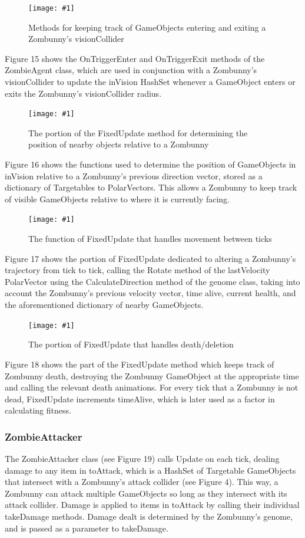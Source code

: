 \documentclass[letterpaper]{article}
\def\imfig#1#2{\begin{figure}[h] \centering \texttt{[image: \#1]} \caption{#2} \end{figure}}
\def\imfigH#1#2{\begin{figure}[H] \centering \texttt{[image: \#1]} \caption{#2} \end{figure}}
\begin{document}
\imfigH{ZombieAgentVision}{Methods for keeping track of GameObjects entering
  and exiting a Zombunny's visionCollider}

Figure 15 shows the OnTriggerEnter and OnTriggerExit methods of the ZombieAgent
class, which are used in conjunction with a Zombunny's visionCollider to update
the inVision HashSet whenever a GameObject enters or exits the Zombunny's
visionCollider radius.

\imfigH{ZombieAgentUpdateNearby}{The portion of the FixedUpdate method for
determining the position of nearby objects relative to a Zombunny}

Figure 16 shows the functions used to determine the position of GameObjects in
inVision relative to a Zombunny's previous direction vector, stored as a
dictionary of Targetables to PolarVectors. This allows a Zombunny to keep track
of visible GameObjects relative to where it is currently facing.

\imfig{ZombieAgentUpdateMovement}{The function of FixedUpdate that handles
  movement between ticks}

Figure 17 shows the portion of FixedUpdate dedicated to altering a Zombunny's
trajectory from tick to tick, calling the Rotate method of the lastVelocity
PolarVector using the CalculateDirection method of the genome class, taking into
account the Zombunny's previous velocity vector, time alive, current health, and
the aforementioned dictionary of nearby GameObjects.

\imfig{ZombieAgentUpdateDeath}{The portion of FixedUpdate that handles
  death/deletion}

Figure 18 shows the part of the FixedUpdate method which keeps track of Zombunny
death, destroying the Zombunny GameObject at the appropriate time and calling
the relevant death animations. For every tick that a Zombunny is not dead,
FixedUpdate increments timeAlive, which is later used as a factor in
calculating fitness.

\subsubsection{ZombieAttacker}

The ZombieAttacker class (see Figure 19) calls Update on each tick, dealing damage to any item
in toAttack, which is a HashSet of Targetable GameObjects that intersect with
a Zombunny's attack collider (see Figure 4). This way, a Zombunny can attack
multiple GameObjects so long as they intersect with its attack collider. Damage
is applied to items in toAttack by calling their individual takeDamage methods.
Damage dealt is determined by the Zombunny's genome, and is passed as a parameter
to takeDamage.
\end{document}
